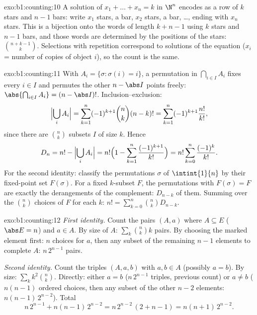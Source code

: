 \begin{solution}{exo:b1:counting:10}
A solution of $x_1 + \dots + x_n = k$ in $\N^n$ encodes as a row of
$k$ stars and $n - 1$ bars: write $x_1$ stars, a bar, $x_2$ stars, a
bar, \dots, ending with $x_n$ stars. This is a bijection onto the
words of length $k + n - 1$ using $k$ stars and $n - 1$ bars, and
those words are determined by the positions of the stars:
$\binom{n + k - 1}{k}$. Selections with repetition correspond to
solutions of the equation ($x_i$ = number of copies of object $i$), so
the count is the same.
\end{solution}

\begin{solution}{exo:b1:counting:11}
With $A_i = \{\sigma : \sigma(i) = i\}$, a permutation in
$\bigcap_{i \in I} A_i$ fixes every $i \in I$ and permutes the other
$n - \abs I$ points freely: $\abs{\bigcap_{i \in I} A_i} =
(n - \abs I)!$. Inclusion--exclusion:
\[
\Bigl|\bigcup_i A_i\Bigr|
= \sum_{k=1}^{n} (-1)^{k+1} \binom nk (n-k)!
= \sum_{k=1}^{n} (-1)^{k+1} \frac{n!}{k!} ,
\]
since there are $\binom nk$ subsets $I$ of size $k$. Hence
\[
D_n = n! - \Bigl|\bigcup_i A_i\Bigr|
= n!\Bigl(1 - \sum_{k=1}^{n} \frac{(-1)^{k+1}}{k!}\Bigr)
= n! \sum_{k=0}^{n} \frac{(-1)^k}{k!} .
\]
For the second identity: classify the permutations $\sigma$ of
$\intint{1}{n}$ by their fixed-point set $F(\sigma)$. For a fixed
$k$-subset $F$, the permutations with $F(\sigma) = F$ are exactly the
derangements of the complement: $D_{n-k}$ of them. Summing over the
$\binom nk$ choices of $F$ for each $k$:
$n! = \sum_{k=0}^{n} \binom nk D_{n-k}$.
\end{solution}

\begin{solution}{exo:b1:counting:12}
\emph{First identity.} Count the pairs $(A, a)$ where $A \subseteq E$
($\abs E = n$) and $a \in A$. By size of $A$: $\sum_k \binom nk k$
pairs. By choosing the marked element first: $n$ choices for $a$, then
any subset of the remaining $n - 1$ elements to complete $A$:
$n\,2^{n-1}$ pairs.

\emph{Second identity.} Count the triples $(A, a, b)$ with $a, b \in
A$ (possibly $a = b$). By size: $\sum_k k^2 \binom nk$. Directly:
either $a = b$ ($n\,2^{n-1}$ triples, previous count) or $a \neq b$
($n(n-1)$ ordered choices, then any subset of the other $n - 2$
elements: $n(n-1)\,2^{n-2}$). Total
\[
n\,2^{n-1} + n(n-1)\,2^{n-2} = n\,2^{n-2}\,(2 + n - 1)
= n(n+1)\,2^{n-2} .
\]
\end{solution}

